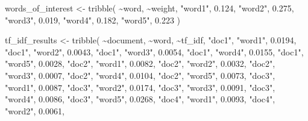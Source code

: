 \documentclass[
]{book}
\newenvironment{Shaded}{\begin{snugshade}}{\end{snugshade}}
\newcommand{\FloatTok}[1]{\textcolor[rgb]{0.00,0.00,0.81}{#1}}
\newcommand{\FunctionTok}[1]{\textcolor[rgb]{0.00,0.00,0.00}{#1}}
\newcommand{\NormalTok}[1]{#1}
\newcommand{\OtherTok}[1]{\textcolor[rgb]{0.56,0.35,0.01}{#1}}
\newcommand{\SpecialCharTok}[1]{\textcolor[rgb]{0.00,0.00,0.00}{#1}}
\newcommand{\StringTok}[1]{\textcolor[rgb]{0.31,0.60,0.02}{#1}}
\begin{document}
\begin{Shaded}
\begin{Highlighting}[]
\NormalTok{words\_of\_interest }\OtherTok{\textless{}{-}} \FunctionTok{tribble}\NormalTok{(}
  \SpecialCharTok{\textasciitilde{}}\NormalTok{word, }\SpecialCharTok{\textasciitilde{}}\NormalTok{weight,}
  \StringTok{"word1"}\NormalTok{, }\FloatTok{0.124}\NormalTok{,}
  \StringTok{"word2"}\NormalTok{, }\FloatTok{0.275}\NormalTok{,}
  \StringTok{"word3"}\NormalTok{, }\FloatTok{0.019}\NormalTok{,}
  \StringTok{"word4"}\NormalTok{, }\FloatTok{0.182}\NormalTok{,}
  \StringTok{"word5"}\NormalTok{, }\FloatTok{0.223}
\NormalTok{)}

\NormalTok{tf\_idf\_results }\OtherTok{\textless{}{-}} \FunctionTok{tribble}\NormalTok{(}
  \SpecialCharTok{\textasciitilde{}}\NormalTok{document, }\SpecialCharTok{\textasciitilde{}}\NormalTok{word, }\SpecialCharTok{\textasciitilde{}}\NormalTok{tf\_idf,}
  \StringTok{"doc1"}\NormalTok{, }\StringTok{"word1"}\NormalTok{, }\FloatTok{0.0194}\NormalTok{,}
  \StringTok{"doc1"}\NormalTok{, }\StringTok{"word2"}\NormalTok{, }\FloatTok{0.0043}\NormalTok{,}
  \StringTok{"doc1"}\NormalTok{, }\StringTok{"word3"}\NormalTok{, }\FloatTok{0.0054}\NormalTok{,}
  \StringTok{"doc1"}\NormalTok{, }\StringTok{"word4"}\NormalTok{, }\FloatTok{0.0155}\NormalTok{,}
  \StringTok{"doc1"}\NormalTok{, }\StringTok{"word5"}\NormalTok{, }\FloatTok{0.0028}\NormalTok{,}
  \StringTok{"doc2"}\NormalTok{, }\StringTok{"word1"}\NormalTok{, }\FloatTok{0.0082}\NormalTok{,}
  \StringTok{"doc2"}\NormalTok{, }\StringTok{"word2"}\NormalTok{, }\FloatTok{0.0032}\NormalTok{,}
  \StringTok{"doc2"}\NormalTok{, }\StringTok{"word3"}\NormalTok{, }\FloatTok{0.0007}\NormalTok{,}
  \StringTok{"doc2"}\NormalTok{, }\StringTok{"word4"}\NormalTok{, }\FloatTok{0.0104}\NormalTok{,}
  \StringTok{"doc2"}\NormalTok{, }\StringTok{"word5"}\NormalTok{, }\FloatTok{0.0073}\NormalTok{,}
  \StringTok{"doc3"}\NormalTok{, }\StringTok{"word1"}\NormalTok{, }\FloatTok{0.0087}\NormalTok{,}
  \StringTok{"doc3"}\NormalTok{, }\StringTok{"word2"}\NormalTok{, }\FloatTok{0.0174}\NormalTok{,}
  \StringTok{"doc3"}\NormalTok{, }\StringTok{"word3"}\NormalTok{, }\FloatTok{0.0091}\NormalTok{,}
  \StringTok{"doc3"}\NormalTok{, }\StringTok{"word4"}\NormalTok{, }\FloatTok{0.0086}\NormalTok{,}
  \StringTok{"doc3"}\NormalTok{, }\StringTok{"word5"}\NormalTok{, }\FloatTok{0.0268}\NormalTok{,}
  \StringTok{"doc4"}\NormalTok{, }\StringTok{"word1"}\NormalTok{, }\FloatTok{0.0093}\NormalTok{,}
  \StringTok{"doc4"}\NormalTok{, }\StringTok{"word2"}\NormalTok{, }\FloatTok{0.0061}\NormalTok{,}

\end{Highlighting}
\end{Shaded}
\end{document}

